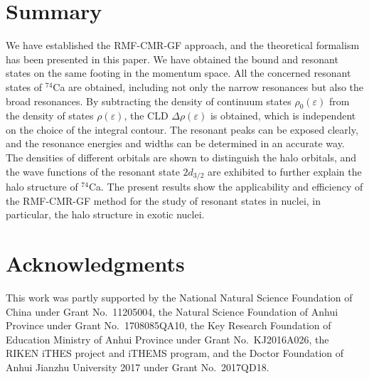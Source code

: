 \documentclass[twocolumn,prc,preprintnumbers,superscriptaddress,floatfix,showpacs]{revtex4}
\begin{document}
\section{Summary}\label{Sec:Summary}

We have established the RMF-CMR-GF approach, and the theoretical formalism has been presented in this paper. We have obtained the bound and resonant states on the same footing in the momentum space. All the concerned resonant states of $^{74}$Ca are obtained, including not only the narrow resonances but also the broad resonances. By subtracting the density of continuum states $\rho_{0}(\varepsilon)$ from the density of states $\rho(\varepsilon)$, the CLD $\Delta\rho(\varepsilon)$ is obtained, which is independent on the choice of the integral contour. The resonant peaks can be exposed clearly, and the resonance energies and widths can be determined in an accurate way. The densities of different orbitals are shown to distinguish the halo orbitals, and the wave functions of the resonant state $2d_{3/2}$ are exhibited to further explain the halo structure of $^{74}$Ca. The present results show the applicability and efficiency of the RMF-CMR-GF method for the study of resonant states in nuclei, in particular, the halo structure in exotic nuclei.

\section*{Acknowledgments}

This work was partly supported by the National Natural Science Foundation of China under Grant No.~11205004, the Natural Science Foundation of Anhui Province under Grant No.~1708085QA10, the Key Research Foundation of Education Ministry of Anhui Province under Grant No.~KJ2016A026, the RIKEN iTHES project and iTHEMS program, and the Doctor Foundation of Anhui Jianzhu University 2017 under Grant No.~2017QD18.
\end{document}
